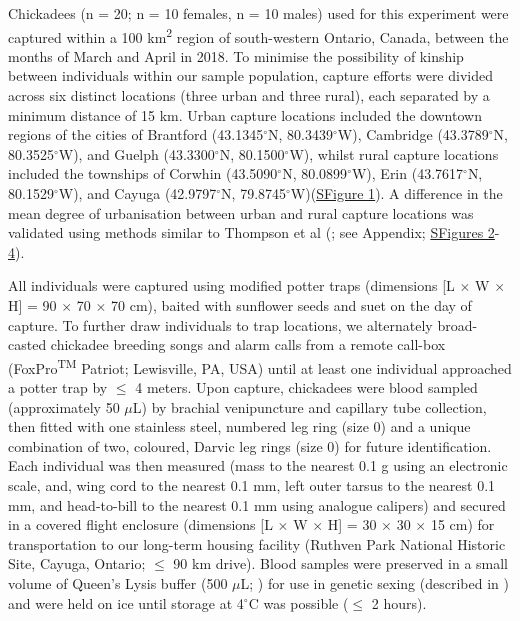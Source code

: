 \documentclass[12pt]{article}
\begin{document}
\noindent Chickadees (n = 20; n = 10 females, n = 10 males) used for this experiment were captured within a 100 km\textsuperscript{2} region of south-western Ontario, Canada, between the months of March and April in 2018. To minimise the possibility of kinship between individuals within our sample population, capture efforts were divided across six distinct locations (three urban and three rural), each separated by a minimum distance of 15 km. Urban capture locations included the downtown regions of the cities of Brantford (43.1345$^{\circ}$N, 80.3439$^{\circ}$W), Cambridge (43.3789$^{\circ}$N, 80.3525$^{\circ}$W), and Guelph (43.3300$^{\circ}$N, 80.1500$^{\circ}$W), whilst rural capture locations included the townships of Corwhin (43.5090$^{\circ}$N, 80.0899$^{\circ}$W), Erin (43.7617$^{\circ}$N, 80.1529$^{\circ}$W), and Cayuga (42.9797$^{\circ}$N, 79.8745$^{\circ}$W)(\hyperref[FigC.1]{SFigure 1}). A difference in the mean degree of urbanisation between urban and rural capture locations was validated using methods similar to Thompson et al (\citeyear{thompson_2018}; see Appendix; \hyperref[FigC.2]{SFigures 2}-\hyperref[FigC.4]{4}). \vspace{1cm}

\noindent All individuals were captured using modified potter traps (dimensions [L $\times$ W $\times$ H] = 90 $\times$ 70 $\times$ 70 cm), baited with sunflower seeds and suet on the day of capture. To further draw individuals to trap locations, we alternately broad-casted chickadee breeding songs and alarm calls from a remote call-box (FoxPro\textsuperscript{TM} Patriot; Lewisville, PA, USA) until at least one individual approached a potter trap by $\leq$ 4 meters. Upon capture, chickadees were blood sampled (approximately 50 $\mu$L) by brachial venipuncture and capillary tube collection, then fitted with one stainless steel, numbered leg ring (size 0) and a unique combination of two, coloured, Darvic leg rings (size 0) for future identification. Each individual was then measured (mass to the nearest 0.1 g using an electronic scale, and, wing cord to the nearest 0.1 mm, left outer tarsus to the nearest 0.1 mm, and head-to-bill to the nearest 0.1 mm using analogue calipers) and secured in a covered flight enclosure (dimensions [L $\times$ W $\times$ H] = 30 $\times$ 30 $\times$ 15 cm) for transportation to our long-term housing facility (Ruthven Park National Historic Site, Cayuga, Ontario; $\leq$ 90 km drive). Blood samples were preserved in a small volume of Queen's Lysis buffer (500 $\mu$L; \citealt{seutin_1991}) for use in genetic sexing (described in \citealt{robertson_2020a}) and were held on ice until storage at 4$^{\circ}$C was possible ($\leq$ 2 hours). \vspace{1cm}
\end{document}
